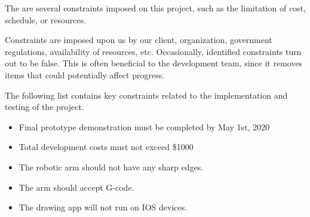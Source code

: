 The are  several constraints imposed on this project, such as the limitation of cost, schedule, or resources.  

Constraints are imposed upon us by our client, organization, government regulations, availability of resources, etc. Occasionally, identified constraints turn out to be false. This is often beneficial to the development team, since it removes items that could potentially affect progress.

The following list contains key constraints related to the implementation and testing of the project.

\begin{itemize}
  \item Final prototype demonstration must be completed by May 1st, 2020
  \item Total development costs must not exceed \$1000
  \item The robotic arm should not have any sharp edges.
  \item The arm should accept G-code. 
  \item The drawing app will not run on IOS devices. 
\end{itemize}
